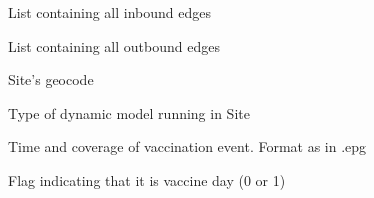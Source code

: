 \documentclass[letterpaper,10pt,english]{sphinxmanual}
\begin{document}
\begin{fulllineitems}
\begin{fulllineitems}
\label{\detokenize{scripting:Site.inedges}}
List containing all inbound edges

\end{fulllineitems}


\begin{fulllineitems}
\label{\detokenize{scripting:Site.outedges}}
List containing all outbound edges

\end{fulllineitems}


\begin{fulllineitems}
\label{\detokenize{scripting:Site.geocode}}
Site’s geocode

\end{fulllineitems}


\begin{fulllineitems}
\label{\detokenize{scripting:Site.modtype}}
Type of dynamic model running in Site

\end{fulllineitems}


\begin{fulllineitems}
\label{\detokenize{scripting:Site.vaccination}}
Time and coverage of vaccination event. Format as in .epg

\end{fulllineitems}


\begin{fulllineitems}
\label{\detokenize{scripting:Site.vaccineNow}}
Flag indicating that it is vaccine day (0 or 1)


\end{fulllineitems}
\end{fulllineitems}
\end{document}
